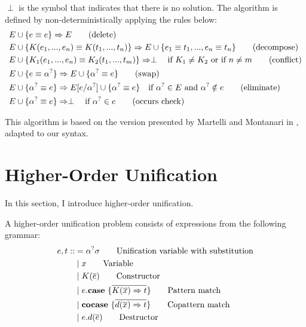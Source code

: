 \documentclass[twoside,12pt,a4paper]{article}
\begin{document}
\begin{definition}
    $\perp$ is the symbol that indicates that there is no solution.
    The algorithm is defined by non-deterministically applying the rules below:
    \begin{align*}
        E & \cup \{ e \equiv e\} \Rightarrow E \tag{delete}\\
        E & \cup \{K(e_1, ..., e_n) \equiv K(t_1, ..., t_n)\} \Rightarrow E \cup \{e_1 \equiv t_1, ..., e_n \equiv t_n\}\tag{decompose}\\
        E & \cup \{K_1(e_1,..., e_n) \equiv K_2(t_1, ..., t_m)\}  \Rightarrow \perp \quad\text{if $K_1 \neq K_2$ or if $n\neq m$} \tag{conflict}\\
        E & \cup \{e \equiv \alpha^?\} \Rightarrow E \cup \{\alpha^? \equiv e\}\tag{swap}\\ 
        E & \cup \{\alpha^? \equiv e\} \Rightarrow E[e/\alpha^?] \cup \{\alpha^? \equiv e\} \quad\text{if $\alpha^? \in E$ and $\alpha^? \notin e$}  \tag{eliminate}\\
        E & \cup \{\alpha^? \equiv e\}\Rightarrow \perp \quad \text{if $\alpha^? \in e$} \tag{occurs check} \label{a}
    \end{align*}
\end{definition}

This algorithm is based on the version presented by Martelli and Montanari in \cite{10.1145/357162.357169},
adapted to our syntax.
\section{Higher-Order Unification}\label{sec:Higher-Order Unification}

In this section, I introduce higher-order unification.

\begin{definition}
    A higher-order unification problem consists of expressions from the following grammar:
    \begin{align*}
        e,t  ::&= \alphaunifvar\sigma \tag*{Unification variable with substitution}\\ %
            &\partition x  \tag*{Variable} \\
            &\partition\constructor \tag*{Constructor} \\
            &\partition\patmatch  \tag*{Pattern match}\\
            &\partition\copatmatch  \tag*{Copattern match}\\
            &\partition\destructor  \tag*{Destructor}
    \end{align*}
\end{definition}
\end{document}
